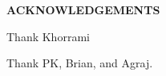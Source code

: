 \clearpage
\vspace*{\fill}
	\begin{center}
		\begin{minipage}{\textwidth}
			{\begin{center}{\textbf{ACKNOWLEDGEMENTS}}\end{center}\vspace{10mm}}
			Thank Khorrami
			
			\vspace{5mm}
			\hspace{5mm} 
			Thank PK, Brian, and Agraj.
		\end{minipage}
	\end{center}
\vfill %
\clearpage

